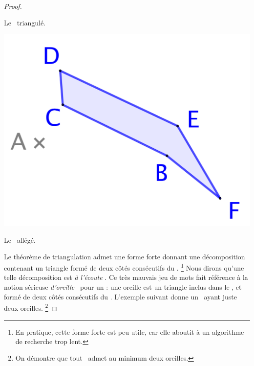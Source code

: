 \begin{proof}
\begin{multicols}{3}
\begin{center}
            \smallskip
            Le \ngone\ triangulé.
        \end{center}


        \begin{center}
            \includegraphics[scale=.4]{content/polygon/at-least-one/triangulation-3.png}

            \smallskip
            Le \ngone\ allégé.
        \end{center}
    \end{multicols}


    Le théorème de triangulation admet une forme forte donnant une décomposition contenant un triangle formé de deux côtés consécutifs du \ngone.%
    \footnote{
        En pratique, cette forme forte est peu utile, car elle aboutit à un algorithme de recherche trop lent.
    }
    Nous dirons qu'une telle décomposition est \og \emph{à l'écoute} \fg.
    Ce très mauvais jeu de mots fait référence à la notion sérieuse \og \emph{d'oreille} \fg\ pour un \ngone: une oreille est un triangle inclus dans le \ngone, et formé de deux côtés consécutifs du \ngone.
    L'exemple suivant donne un \ngone\ ayant juste deux oreilles.%
    \footnote{
        On démontre que tout \ngone\ admet au minimum deux oreilles.
    }



\end{proof}
